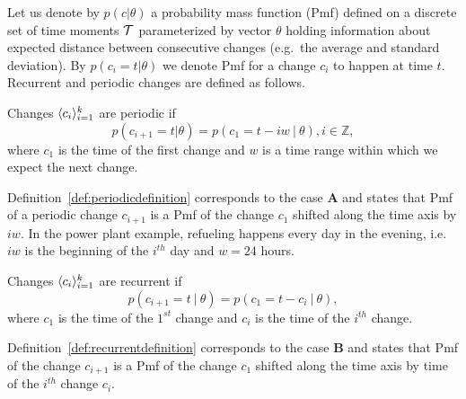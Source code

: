 Let us denote by $p(c|\theta)$ a probability mass function (Pmf) defined on a discrete set of time moments $\mathcal{T}$ parameterized by vector $\theta$ holding information about expected distance between consecutive changes (e.g.\ the average and standard deviation).
By $p(c_i=t|\theta)$ we denote Pmf for a change $c_i$ to happen at time $t$. Recurrent and periodic changes are defined as follows.
\begin{definition}
\label{def:periodicdefinition}
Changes $\langle c_i \rangle_{i=1}^k$ are periodic if
\begin{equation}
p(c_{i+1} = t|\theta) = p(c_1 = t - i w \: | \: \theta), i \in \mathbb{Z},
\label{eq:procwithrefs}
\end{equation}
where $c_1$ is the time of the first change and $w$ is a time range within which we expect the next change.
\end{definition}
Definition~\ref{def:periodicdefinition} corresponds to the case \textbf{A} and states that Pmf of a periodic change $c_{i+1}$ is a Pmf of the change $c_1$ shifted along the time axis by  $i w$.
In the power plant example, refueling happens every day in the evening, i.e.\ $i w$ is the beginning of the $i^{th}$ day and $w = 24$ hours.
\begin{definition}
\label{def:recurrentdefinition}
Changes $\langle  c_i  \rangle_{i=1}^k$ are recurrent if
\begin{equation}
p(c_{i+1} = t \: | \: \theta) = p(c_1 = t - c_{i} \: | \: \theta),
\label{eq:procnorefs}
\end{equation}
where
$c_1$ is the time of the $1^{st}$ change and
$c_i$ is the time of the $i^{th}$ change.
\end{definition}
Definition~\ref{def:recurrentdefinition} corresponds to the case \textbf{B} and states that Pmf of the change $c_{i+1}$ is a Pmf of the change $c_1$ shifted along the time axis by time of the $i^{th}$ change $c_i$.

